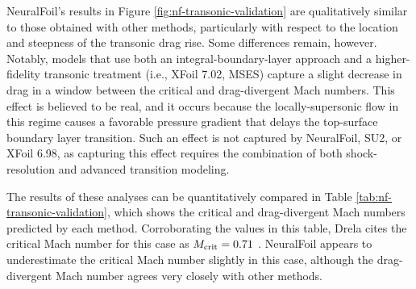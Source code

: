 NeuralFoil's results in Figure \ref{fig:nf-transonic-validation} are qualitatively similar to those obtained with other methods, particularly with respect to the location and steepness of the transonic drag rise. Some differences remain, however. Notably, models that use both an integral-boundary-layer approach and a higher-fidelity transonic treatment (i.e., XFoil 7.02, MSES) capture a slight decrease in drag in a window between the critical and drag-divergent Mach numbers. This effect is believed to be real, and it occurs because the locally-supersonic flow in this regime causes a favorable pressure gradient that delays the top-surface boundary layer transition. Such an effect is not captured by NeuralFoil, SU2, or XFoil 6.98, as capturing this effect requires the combination of both shock-resolution and advanced transition modeling.

The results of these analyses can be quantitatively compared in Table \ref{tab:nf-transonic-validation}, which shows the critical and drag-divergent Mach numbers predicted by each method. Corroborating the values in this table, Drela cites the critical Mach number for this case as $M_{\rm crit}=0.71$ \cite{drela_flight_2013}. NeuralFoil appears to underestimate the critical Mach number slightly in this case, although the drag-divergent Mach number agrees very closely with other methods.

